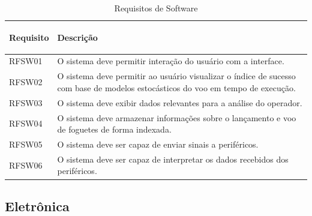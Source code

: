 \begin{table}[H]
\begin{tabular}{ | m{2cm} | m{12cm}| } 
 \hline
 \textbf{Requisito } & \begin{center} \textbf{Descrição}\end{center}\\
 \hline
 RFSW01 & O sistema deve permitir interação do usuário com a interface.\\
 \hline
 RFSW02 & O sistema deve permitir ao usuário visualizar o índice de sucesso com base de modelos estocásticos do voo em tempo de execução. \\
 \hline
 RFSW03 & O sistema deve exibir dados relevantes para a análise do operador. \\
 \hline
 RFSW04 & O sistema deve armazenar informações sobre o lançamento e voo de foguetes de forma indexada. \\
 \hline
 RFSW05 & O sistema deve ser capaz de enviar sinais a periféricos. \\
 \hline
 RFSW06 & O sistema deve ser capaz de interpretar os dados recebidos dos periféricos. \\
 \hline
\end{tabular}
\label{Requisitos de Software}
\caption{Requisitos de Software}
\end{table}


\subsection{Eletrônica}

